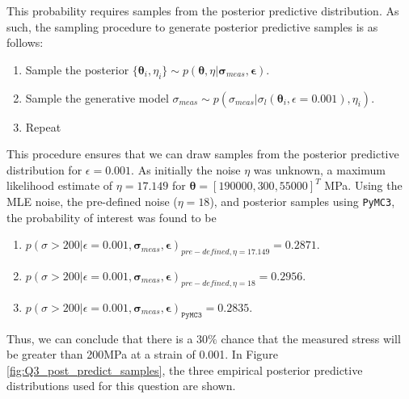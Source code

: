 \documentclass{article}
\begin{document}
	This probability requires samples from the posterior predictive distribution. As such, the sampling procedure to generate posterior predictive samples is as follows:
	\begin{enumerate}
		\item Sample the posterior $\{\boldsymbol{\theta}_i, \eta_i\} \sim p(\boldsymbol{\theta}, \eta \vert \boldsymbol\sigma_{meas}, \boldsymbol\epsilon)$.
		\item Sample the generative model $\sigma_{meas} \sim p(\sigma_{meas} \vert \sigma_l(\boldsymbol\theta_i, \epsilon = 0.001), \eta_i)$.
		\item Repeat
	\end{enumerate} 

	This procedure ensures that we can draw samples from the posterior predictive distribution for $\epsilon = 0.001.$ As initially the noise $\eta$ was unknown, a maximum likelihood estimate of $\eta = 17.149$ for $\boldsymbol\theta = [190 000, 300, 55 000]^T$ MPa. Using the MLE noise, the pre-defined noise ($\eta = 18$), and posterior samples using \texttt{PyMC3}, the probability of interest was found to be
	\begin{enumerate}
		\item $p(\sigma > 200 \vert \epsilon = 0.001, \boldsymbol\sigma_{meas}, \boldsymbol\epsilon)_{pre-defined, \eta = 17.149} = 0.2871$.
		\item $p(\sigma > 200 \vert \epsilon = 0.001, \boldsymbol\sigma_{meas}, \boldsymbol\epsilon)_{pre-defined, \eta = 18} = 0.2956$.
		\item $p(\sigma > 200 \vert \epsilon = 0.001, \boldsymbol\sigma_{meas}, \boldsymbol\epsilon)_{\texttt{PyMC3}} = 0.2835$.
	\end{enumerate}
	Thus, we can conclude that there is a $30\%$ chance that the measured stress will be greater than 200MPa at a strain of 0.001. In Figure \ref{fig:Q3_post_predict_samples}, the three empirical posterior predictive distributions used for this question are shown.
\end{document}
